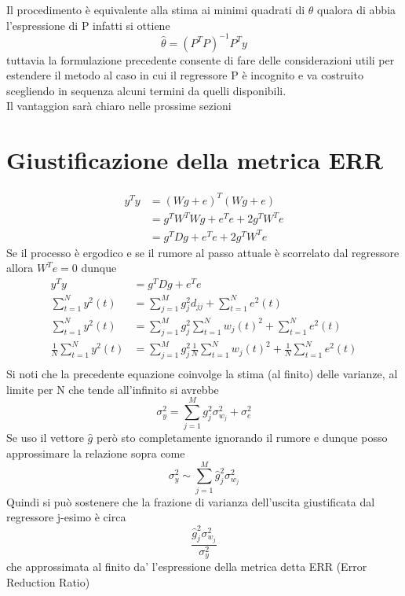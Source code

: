 Il procedimento è equivalente alla stima ai minimi quadrati di $\theta$ qualora di abbia l'espressione di P
infatti si ottiene
\begin{equation}
\hat{\theta}=(P^TP)^{-1}P^Ty
\end{equation}
tuttavia la formulazione precedente consente di fare delle considerazioni utili per estendere il metodo al caso in cui il regressore P è incognito e va costruito scegliendo in sequenza alcuni termini da quelli disponibili.\\
Il vantaggion sarà chiaro nelle prossime sezioni
\section{Giustificazione della metrica ERR}
\begin{align*}
y^Ty&=(Wg+e)^T(Wg+e)\\
&=g^TW^TWg+e^Te+2g^TW^Te\\
&=g^TDg+e^Te+2g^TW^Te
\end{align*}
Se il processo è ergodico e se il rumore al passo attuale è scorrelato dal regressore allora $W^Te=0$ dunque
\begin{align*}
y^Ty&=g^TDg+e^Te\\
\sum_{t=1}^Ny^2(t)&=\sum_{j=1}^M g_j^2 d_{jj}+\sum_{t=1}^Ne^2(t) \\
\sum_{t=1}^Ny^2(t)&=\sum_{j=1}^M g_j^2 \sum_{t=1}^N w_j(t)^2+\sum_{t=1}^Ne^2(t) \\
\frac{1}{N}\sum_{t=1}^Ny^2(t)&=\sum_{j=1}^M g_j^2 \frac{1}{N}\sum_{t=1}^N w_j(t)^2+\frac{1}{N}\sum_{t=1}^Ne^2(t) \\
\end{align*}
Si noti che la precedente equazione coinvolge la stima (al finito) delle varianze, al limite  per N che tende all'infinito si avrebbe
\begin{equation}
\sigma_y^2=\sum_{j=1}^M g_j^2 \sigma_{w_j}^2+\sigma_e^2 
\end{equation}
Se uso il vettore $\hat{g}$ però sto completamente ignorando il rumore e dunque posso approssimare la relazione sopra come
\begin{equation}
\sigma_y^2\sim \sum_{j=1}^M \hat{g}_j^2 \sigma_{w_j}^2
\end{equation}
Quindi si può sostenere che la frazione di varianza dell'uscita giustificata dal regressore j-esimo è circa
\begin{equation}
\frac{\hat{g}_j^2 \sigma_{w_j}^2}{\sigma_y^2}
\end{equation}
che approssimata al finito da' l'espressione della metrica detta ERR (Error Reduction Ratio)
